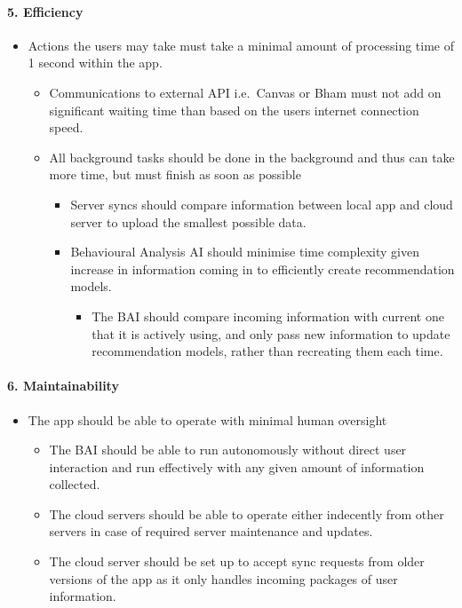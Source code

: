 \documentclass[a4paper,11pt]{article} %
\begin{document}
\hypertarget{efficiency}{%
\paragraph{5. Efficiency}\label{efficiency}}

\begin{itemize}
\item
  Actions the users may take must take a minimal amount of processing
  time of 1 second within the app.

  \begin{itemize}
  \item
    Communications to external API i.e.~Canvas or Bham must not add on
    significant waiting time than based on the users internet connection
    speed.
  \item
    All background tasks should be done in the background and thus can
    take more time, but must finish as soon as possible

    \begin{itemize}
    \item
      Server syncs should compare information between local app and
      cloud server to upload the smallest possible data.
    \item
      Behavioural Analysis AI should minimise time complexity given
      increase in information coming in to efficiently create
      recommendation models.

      \begin{itemize}
      \item
        The BAI should compare incoming information with current one
        that it is actively using, and only pass new information to
        update recommendation models, rather than recreating them each
        time.
      \end{itemize}
    \end{itemize}
  \end{itemize}
\end{itemize}

\hypertarget{maintainability}{%
\paragraph{6. Maintainability}\label{maintainability}}

\begin{itemize}
\item
  The app should be able to operate with minimal human oversight

  \begin{itemize}
  \item
    The BAI should be able to run autonomously without direct user
    interaction and run effectively with any given amount of information
    collected.
  \item
    The cloud servers should be able to operate either indecently from
    other servers in case of required server maintenance and updates.
  \item
    The cloud server should be set up to accept sync requests from older
    versions of the app as it only handles incoming packages of user
    information.
  \end{itemize}
\end{itemize}
\end{document}
